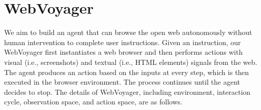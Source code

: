 \documentclass[11pt]{article}
\newcommand{\dai}[2][]{\todo[color=cyan,size=\scriptsize,fancyline,caption={},#1]{DAI:#2}}
\begin{document}




\section{WebVoyager} 
We aim to build an agent that can browse the open web autonomously without human intervention to complete user instructions. Given an instruction, our WebVoyager first instantiates a web browser and then performs actions with visual (i.e., screenshots) and textual (i.e., HTML elements) signals from the web. 
The agent produces an action based on the inputs at every step, which is then executed in the browser environment. 
The process continues until the agent decides to stop. The details of WebVoyager, including environment, interaction cycle, observation space, and action space, are as follows.
\end{document}
